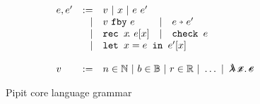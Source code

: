 \begin{figure}
  \[
  \begin{array}{lrlll}
    e, e' & := & v ~|~ x ~|~ e~e' \\
          & | & \xfby{v}{e} & | & \xthen{e}{e'} \\
          & | & \xrec{x}{e[x]} & | & \xcheck{e} \\
          & | & \multicolumn{3}{l}{\xlet{x}{e}{e'[x]}} \\
    \\
    v & := & \multicolumn{3}{l}{n \in \mathbb{N} ~|~ b \in \mathbb{B} ~|~ r \in \mathbb{R} ~|~ \hdots ~|~ \mlamX} \\
    \end{array}
  \]
  \caption{Pipit core language grammar}
  \label{f:core-grammar}
\end{figure}